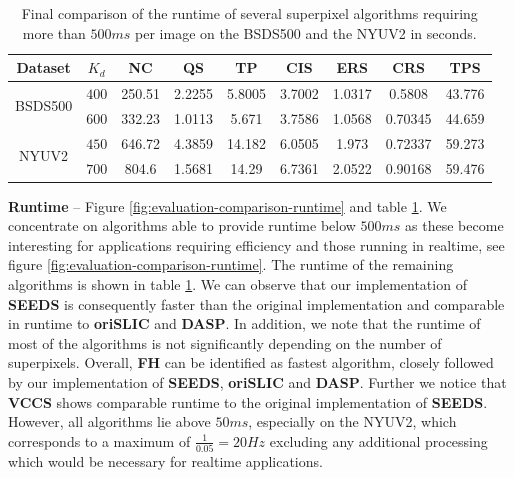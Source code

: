 \begin{table}[b]
	\footnotesize
	\centering
	\begin{tabular}{| c | c | c | c | c | c | c | c | c |}
		\hline
		Dataset & $K_d$ & \textbf{NC} & \textbf{QS} & \textbf{TP} & \textbf{CIS} & \textbf{ERS} & \textbf{CRS} & \textbf{TPS}\\\hline\hline
		\multirow{2}{*}{BSDS500}& $400$ & 250.51 & 2.2255 & 5.8005 & 3.7002 & 1.0317 & 0.5808 & 43.776 \\\cline{2-9}
		& $600$ & 332.23 & 1.0113 & 5.671 & 3.7586 & 1.0568 & 0.70345 & 44.659\\\hline\hline
		\multirow{2}{*}{NYUV2}& $450$ & 646.72 & 4.3859 & 14.182 & 6.0505 & 1.973 & 0.72337 & 59.273 \\\cline{2-9}
		& $700$ & 804.6 & 1.5681 & 14.29 & 6.7361 & 2.0522 & 0.90168 & 59.476\\\hline
	\end{tabular}
	\caption[Final comparison of the runtime of several superpixel algorithms requiring more than $500ms$ per image on the Berkeley Segmentation Dataset \cite{ArbelaezMaireFowlkesMalik:2011} and the NYU Depth Dataset \cite{SilbermanHoiemKohliFergus:2012}.]{Final comparison of the runtime of several superpixel algorithms requiring more than $500ms$ per image on the BSDS500 and the NYUV2 in seconds.}
	\label{table:evaluation-comparison-runtime}
\end{table}
\textbf{Runtime} -- Figure \ref{fig:evaluation-comparison-runtime} and table \ref{table:evaluation-comparison-runtime}. We concentrate on algorithms able to provide runtime below $500ms$ as these become interesting for applications requiring efficiency and those running in realtime, see figure \ref{fig:evaluation-comparison-runtime}. The runtime of the remaining algorithms is shown in table \ref{table:evaluation-comparison-runtime}. We can observe that our implementation of \textbf{SEEDS} is consequently faster than the original implementation and comparable in runtime to \textbf{oriSLIC} and \textbf{DASP}. In addition, we note that the runtime of most of the algorithms is not significantly depending on the number of superpixels. Overall, \textbf{FH} can be identified as fastest algorithm, closely followed by our implementation of \textbf{SEEDS}, \textbf{oriSLIC} and \textbf{DASP}. Further we notice that \textbf{VCCS} shows comparable runtime to the original implementation of \textbf{SEEDS}. However, all algorithms lie above $50ms$, especially on the NYUV2, which corresponds to a maximum of $\frac{1}{0.05} = 20 Hz$ excluding any additional processing which would be necessary for realtime applications.

